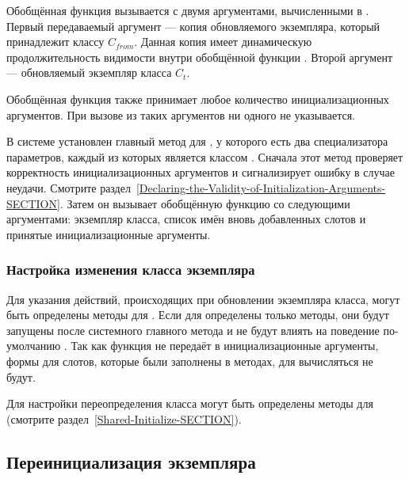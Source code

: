 Обобщённая функция  вызывается с двумя
аргументами, вычисленными в . Первый передаваемый аргумент ---
копия обновляемого экземпляра, который принадлежит классу $C_{from}$. Данная
копия имеет динамическую продолжительность видимости внутри обобщённой функции
. Второй аргумент --- обновляемый экземпляр класса $C_{t}$.

Обобщённая функция  также принимает
любое количество инициализационных аргументов. При вызове из 
таких аргументов ни одного не указывается.

В системе установлен главный метод для
, у которого есть два специализатора
параметров, каждый из которых является классом . Сначала
этот метод проверяет корректность инициализационных аргументов и сигнализирует
ошибку в случае неудачи. Смотрите
раздел~\ref{Declaring-the-Validity-of-Initialization-Arguments-SECTION}. 
Затем он вызывает обобщённую функцию  со следующими
аргументами: экземпляр класса, список имён вновь добавленных слотов и принятые
инициализационные аргументы.

\subsubsection{Настройка изменения класса экземпляра}

Для указания действий, происходящих при обновлении экземпляра класса, могут быть
определены методы для . Если для
 определены только  методы,
они будут запущены после системного главного метода и не будут влиять на
поведение по-умолчанию . Так как
функция  не передаёт в
 инициализационные
аргументы, формы  для слотов, которые были заполнены в 
методах, для  вычисляться не будут.

Для настройки переопределения класса могут быть определены методы для
 (смотрите раздел~\ref{Shared-Initialize-SECTION}).

\subsection{Переинициализация экземпляра}
\label{Reinitializing-an-Instance-SECTION}

